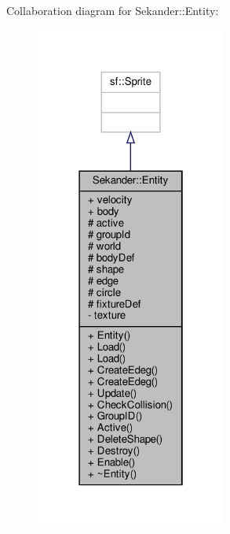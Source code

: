 Collaboration diagram for Sekander\+:\+:Entity\+:
\nopagebreak
\begin{figure}[H]
\begin{center}
\leavevmode
\includegraphics[width=178pt]{classSekander_1_1Entity__coll__graph}
\end{center}
\end{figure}
